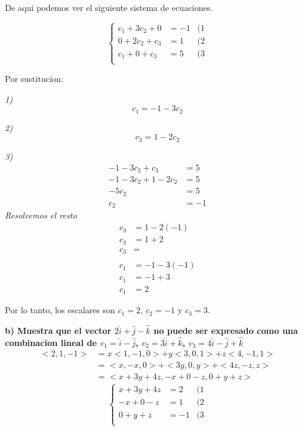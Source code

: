 \documentclass[11pt,letterpaper]{article}
\begin{document}
De aqui podemos ver el siguiente sistema de ecuaciones.

\begin{equation*}
     \left\{\begin{matrix}
         c_1 + 3c_2 + 0&= -1 & (1\\
         0 + 2c_2 + c_3&= 1 & (2\\
         c_1 + 0 + c_3&= 5  & (3\\
\end{matrix}\right.
\end{equation*}

Por sustitucion:

\textit{1)}
\begin{equation*}
        c_1=-1-3c_2
\end{equation*}

\textit{2)}
\begin{equation*}
    c_3=1-2c_2
\end{equation*}

\textit{3)}
\begin{equation*}
    \begin{split}
        -1-3c_2+c_3 &= 5\\
        -1-3c_2+1-2c_2&=5\\
        -5c_2 &= 5\\
        c_2&=-1
    \end{split}
\end{equation*}
\textit{Resolvemos el resto}
\begin{equation*}
    \begin{split}
        c_3 &= 1-2(-1)\\
        c_3 &= 1+2\\
        c_3 &=\\ \\
        c_1 &= -1-3(-1)\\
        c_1 &= -1+3\\
        c_1 &= 2
    \end{split}
\end{equation*}

Por lo tanto, los escalares son $c_1=2$, $c_2=-1$ y $c_3=3$.


\textbf{b) Muestra que el vector $2\hat{i} + \hat{j} - \hat{k}$ no puede ser expresado como una combinacion lineal de $v_1=\hat{i}-\hat{j}$, $v_2=3\hat{i}+\hat{k}$, $v_3=4\hat{i}-\hat{j}+\hat{k}$}
\begin{equation*}
    \begin{split}
        <2,1,-1> &= x<1,-1,0> + y<3,0,1> + z<4,-1,1>\\
        &= <x,-x,0> + <3y,0,y> + <4z,-z,z>\\
        &= <x+3y+4z,-x+0-z,0+y+z>
    \end{split}
\end{equation*}
\begin{equation*}
     \left\{\begin{matrix}
         x+3y+4z &= 2 & (1\\
         -x+0-z &= 1 & (2\\
         0+y+z &= -1  & (3\\
    \end{matrix}\right.
\end{equation*}
\end{document}
